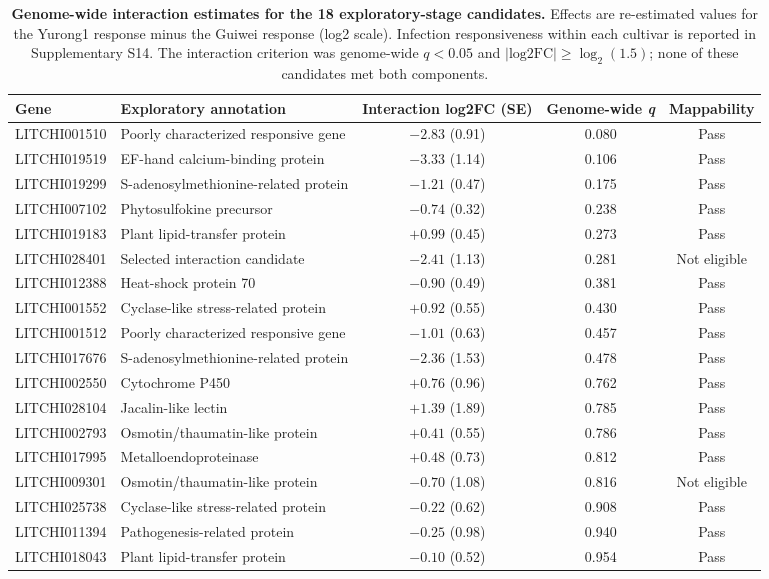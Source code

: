\documentclass[11pt]{article}
\newcommand{\q}{\textit{q}}
\begin{document}
\begin{table}[p]
\centering
\caption{\textbf{Genome-wide interaction estimates for the 18 exploratory-stage candidates.} Effects are re-estimated values for the Yurong1 response minus the Guiwei response (log2 scale). Infection responsiveness within each cultivar is reported in Supplementary S14. The interaction criterion was genome-wide $\q<0.05$ and $|\mathrm{log2FC}|\ge\log_2(1.5)$; none of these candidates met both components.}
\label{tab:legacy}
\footnotesize
\begin{tabular}{@{}llccc@{}}
\toprule
\textbf{Gene} & \textbf{Exploratory annotation} & \textbf{Interaction log2FC (SE)} & \textbf{Genome-wide \q} & \textbf{Mappability} \\
\midrule
LITCHI001510 & Poorly characterized responsive gene & $-2.83$ (0.91) & 0.080 & Pass \\
LITCHI019519 & EF-hand calcium-binding protein & $-3.33$ (1.14) & 0.106 & Pass \\
LITCHI019299 & S-adenosylmethionine-related protein & $-1.21$ (0.47) & 0.175 & Pass \\
LITCHI007102 & Phytosulfokine precursor & $-0.74$ (0.32) & 0.238 & Pass \\
LITCHI019183 & Plant lipid-transfer protein & $+0.99$ (0.45) & 0.273 & Pass \\
LITCHI028401 & Selected interaction candidate & $-2.41$ (1.13) & 0.281 & Not eligible \\
LITCHI012388 & Heat-shock protein 70 & $-0.90$ (0.49) & 0.381 & Pass \\
LITCHI001552 & Cyclase-like stress-related protein & $+0.92$ (0.55) & 0.430 & Pass \\
LITCHI001512 & Poorly characterized responsive gene & $-1.01$ (0.63) & 0.457 & Pass \\
LITCHI017676 & S-adenosylmethionine-related protein & $-2.36$ (1.53) & 0.478 & Pass \\
LITCHI002550 & Cytochrome P450 & $+0.76$ (0.96) & 0.762 & Pass \\
LITCHI028104 & Jacalin-like lectin & $+1.39$ (1.89) & 0.785 & Pass \\
LITCHI002793 & Osmotin/thaumatin-like protein & $+0.41$ (0.55) & 0.786 & Pass \\
LITCHI017995 & Metalloendoproteinase & $+0.48$ (0.73) & 0.812 & Pass \\
LITCHI009301 & Osmotin/thaumatin-like protein & $-0.70$ (1.08) & 0.816 & Not eligible \\
LITCHI025738 & Cyclase-like stress-related protein & $-0.22$ (0.62) & 0.908 & Pass \\
LITCHI011394 & Pathogenesis-related protein & $-0.25$ (0.98) & 0.940 & Pass \\
LITCHI018043 & Plant lipid-transfer protein & $-0.10$ (0.52) & 0.954 & Pass \\
\bottomrule
\end{tabular}
\end{table}
\end{document}
